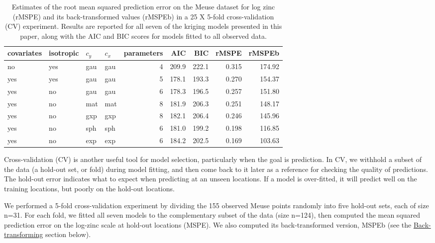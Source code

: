 \begin{table}

\caption{\label{tab:cv-table-latex}Estimates of the root mean squared prediction error on the Meuse dataset for log zinc (rMSPE) and its back-transformed values (rMSPEb) in a 25 X 5-fold cross-validation (CV) experiment. Results are reported for all seven of the kriging models presented in this paper, along with the AIC and BIC scores for models fitted to all observed data.}
\centering
\fontsize{9}{11}\selectfont
\begin{tabular}[t]{llllrrrrr}
\toprule
covariates & isotropic & $c_y$ & $c_x$ & parameters & AIC & BIC & rMSPE & rMSPEb\\
\midrule
no & yes & gau & gau & 4 & 209.9 & 222.1 & 0.315 & 174.92\\
yes & yes & gau & gau & 5 & 178.1 & 193.3 & 0.270 & 154.37\\
yes & no & gau & gau & 6 & 178.3 & 196.5 & 0.257 & 151.80\\
yes & no & mat & mat & 8 & 181.9 & 206.3 & 0.251 & 148.17\\
yes & no & gxp & gxp & 8 & 182.1 & 206.4 & 0.246 & 145.96\\
yes & no & sph & sph & 6 & 181.0 & 199.2 & 0.198 & 116.85\\
yes & no & exp & exp & 6 & 184.2 & 202.5 & 0.169 & 103.63\\
\bottomrule
\end{tabular}
\end{table}

Cross-validation (CV) is another useful tool for model selection, particularly when the goal is prediction. In CV, we withhold a subset of the data (a hold-out set, or fold) during model fitting, and then come back to it later as a reference for checking the quality of predictions. The hold-out error indicates what to expect when predicting at an unseen locations. If a model is over-fitted, it will predict well on the training locations, but poorly on the hold-out locations.

We performed a 5-fold cross-validation experiment by dividing the 155 observed Meuse points randomly into five hold-out sets, each of size n=31. For each fold, we fitted all seven models to the complementary subset of the data (size n=124), then computed the mean squared prediction error on the log-zinc scale at hold-out locations (MSPE). We also computed its back-transformed version, MSPEb (see the \protect\hyperlink{back-transforming}{Back-transforming} section below).

